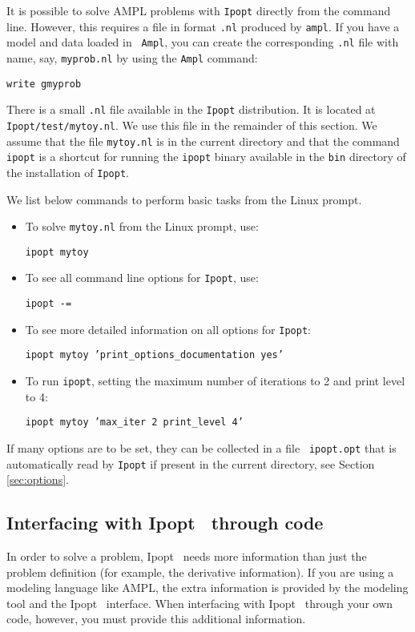 \documentclass[10pt]{article}
\newcommand{\Ipopt}{{\sc Ipopt }}
\begin{document}
It is possible to solve AMPL problems with {\tt Ipopt} directly from
the command line. However, this requires a file in format {\tt .nl}
produced by {\tt ampl}.  If you have a model and data loaded in {\tt
  Ampl}, you can create the corresponding {\tt .nl} file with name,
say, {\tt myprob.nl} by using the {\tt Ampl} command:

{\tt write gmyprob}

There is a small {\tt .nl} file available in the {\tt Ipopt} distribution. It is
located at {\tt Ipopt/test/mytoy.nl}. 
We use this file in the remainder of this section. We assume that the file
{\tt mytoy.nl} is in the current directory and that the command 
{\tt ipopt} is a shortcut for running the {\tt ipopt} binary available
in the {\tt bin} directory of the installation of {\tt Ipopt}. 

We list below commands to perform basic tasks from the Linux prompt.

\begin{itemize}
\item To solve {\tt mytoy.nl} from the Linux prompt, use:

{\tt ipopt mytoy}

\item To see all command line options for {\tt Ipopt}, use:

{\tt ipopt -=}

\item To see more detailed information on all options for {\tt Ipopt}:

{\tt ipopt mytoy 'print\_options\_documentation yes'}

\item To run {\tt ipopt}, setting the maximum number of iterations to 2 and 
print level to 4:

{\tt ipopt mytoy 'max\_iter 2 print\_level 4'}
\end{itemize}

If many options are to be set, they can be collected in a file {\tt
  ipopt.opt} that is automatically read by {\tt Ipopt} if present in
the current directory, see Section \ref{sec:options}.


\subsection{Interfacing with \Ipopt\ through code}
In order to solve a problem, \Ipopt\ needs more information than just
the problem definition (for example, the derivative information). If
you are using a modeling language like AMPL, the extra information is
provided by the modeling tool and the \Ipopt\ interface. When
interfacing with \Ipopt\ through your own code, however, you must
provide this additional information.
\end{document}
